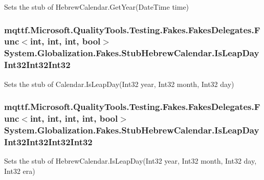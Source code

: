 Sets the stub of Hebrew\-Calendar.\-Get\-Year(\-Date\-Time time)

\hypertarget{class_system_1_1_globalization_1_1_fakes_1_1_stub_hebrew_calendar_a84abcdf6a22c40b78fd177eacc29cc29}{
\subsubsection[{Is\-Leap\-Day\-Int32\-Int32\-Int32}]{\setlength{\rightskip}{0pt plus 5cm}mqttf.\-Microsoft.\-Quality\-Tools.\-Testing.\-Fakes.\-Fakes\-Delegates.\-Func$<$int, int, int, bool$>$ System.\-Globalization.\-Fakes.\-Stub\-Hebrew\-Calendar.\-Is\-Leap\-Day\-Int32\-Int32\-Int32}}\label{class_system_1_1_globalization_1_1_fakes_1_1_stub_hebrew_calendar_a84abcdf6a22c40b78fd177eacc29cc29}


Sets the stub of Calendar.\-Is\-Leap\-Day(\-Int32 year, Int32 month, Int32 day)

\hypertarget{class_system_1_1_globalization_1_1_fakes_1_1_stub_hebrew_calendar_aca96bc82f231677117bd69621fe5b154}{
\subsubsection[{Is\-Leap\-Day\-Int32\-Int32\-Int32\-Int32}]{\setlength{\rightskip}{0pt plus 5cm}mqttf.\-Microsoft.\-Quality\-Tools.\-Testing.\-Fakes.\-Fakes\-Delegates.\-Func$<$int, int, int, int, bool$>$ System.\-Globalization.\-Fakes.\-Stub\-Hebrew\-Calendar.\-Is\-Leap\-Day\-Int32\-Int32\-Int32\-Int32}}\label{class_system_1_1_globalization_1_1_fakes_1_1_stub_hebrew_calendar_aca96bc82f231677117bd69621fe5b154}


Sets the stub of Hebrew\-Calendar.\-Is\-Leap\-Day(\-Int32 year, Int32 month, Int32 day, Int32 era)

